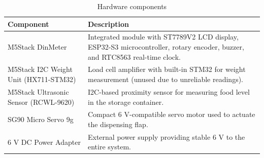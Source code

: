 \documentclass[12pt]{article}
\begin{document}
\begin{table}[h]
    \centering
    \begin{tabular}{p{} p{}}
        \hline
        \textbf{Component}                    & \textbf{Description}                                                                                                        \\
        \hline
        M5Stack DinMeter                      & Integrated module with ST7789V2 LCD display, ESP32-S3 microcontroller, rotary encoder, buzzer, and RTC8563 real-time clock. \\
        M5Stack I2C Weight Unit (HX711-STM32) & Load cell amplifier with built-in STM32 for weight measurement (unused due to unreliable readings).                         \\
        M5Stack Ultrasonic Sensor (RCWL-9620) & I2C-based proximity sensor for measuring food level in the storage container.                                               \\
        SG90 Micro Servo 9g                   & Compact 6 V-compatible servo motor used to actuate the dispensing flap.                                                     \\
        6 V DC Power Adapter                  & External power supply providing stable 6 V to the entire system.                                                            \\
        \hline
    \end{tabular}
    \caption{Hardware components}
\end{table}
\end{document}
